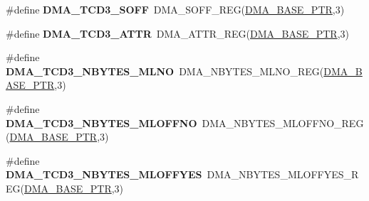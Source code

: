 \begin{DoxyCompactItemize}
\item 
\hypertarget{group___d_m_a___register___accessor___macros_ga15058eb1943489c3a2f36308d61fd628}{}\#define {\bfseries D\+M\+A\+\_\+\+T\+C\+D3\+\_\+\+S\+O\+F\+F}~D\+M\+A\+\_\+\+S\+O\+F\+F\+\_\+\+R\+E\+G(\hyperlink{group___d_m_a___peripheral_ga6997fbc1b1973e9f27170217a3bd6f22}{D\+M\+A\+\_\+\+B\+A\+S\+E\+\_\+\+P\+T\+R},3)\label{group___d_m_a___register___accessor___macros_ga15058eb1943489c3a2f36308d61fd628}

\item 
\hypertarget{group___d_m_a___register___accessor___macros_ga2782d5194fea9642ce17125a8c1b8e67}{}\#define {\bfseries D\+M\+A\+\_\+\+T\+C\+D3\+\_\+\+A\+T\+T\+R}~D\+M\+A\+\_\+\+A\+T\+T\+R\+\_\+\+R\+E\+G(\hyperlink{group___d_m_a___peripheral_ga6997fbc1b1973e9f27170217a3bd6f22}{D\+M\+A\+\_\+\+B\+A\+S\+E\+\_\+\+P\+T\+R},3)\label{group___d_m_a___register___accessor___macros_ga2782d5194fea9642ce17125a8c1b8e67}

\item 
\hypertarget{group___d_m_a___register___accessor___macros_ga19846e750847e4f60b1e73fed4224075}{}\#define {\bfseries D\+M\+A\+\_\+\+T\+C\+D3\+\_\+\+N\+B\+Y\+T\+E\+S\+\_\+\+M\+L\+N\+O}~D\+M\+A\+\_\+\+N\+B\+Y\+T\+E\+S\+\_\+\+M\+L\+N\+O\+\_\+\+R\+E\+G(\hyperlink{group___d_m_a___peripheral_ga6997fbc1b1973e9f27170217a3bd6f22}{D\+M\+A\+\_\+\+B\+A\+S\+E\+\_\+\+P\+T\+R},3)\label{group___d_m_a___register___accessor___macros_ga19846e750847e4f60b1e73fed4224075}

\item 
\hypertarget{group___d_m_a___register___accessor___macros_ga15bc0c9aad4d4aad6febd15eb31cc834}{}\#define {\bfseries D\+M\+A\+\_\+\+T\+C\+D3\+\_\+\+N\+B\+Y\+T\+E\+S\+\_\+\+M\+L\+O\+F\+F\+N\+O}~D\+M\+A\+\_\+\+N\+B\+Y\+T\+E\+S\+\_\+\+M\+L\+O\+F\+F\+N\+O\+\_\+\+R\+E\+G(\hyperlink{group___d_m_a___peripheral_ga6997fbc1b1973e9f27170217a3bd6f22}{D\+M\+A\+\_\+\+B\+A\+S\+E\+\_\+\+P\+T\+R},3)\label{group___d_m_a___register___accessor___macros_ga15bc0c9aad4d4aad6febd15eb31cc834}

\item 
\hypertarget{group___d_m_a___register___accessor___macros_gab3dd0db34f893d8115cc7bf6f0bd5a07}{}\#define {\bfseries D\+M\+A\+\_\+\+T\+C\+D3\+\_\+\+N\+B\+Y\+T\+E\+S\+\_\+\+M\+L\+O\+F\+F\+Y\+E\+S}~D\+M\+A\+\_\+\+N\+B\+Y\+T\+E\+S\+\_\+\+M\+L\+O\+F\+F\+Y\+E\+S\+\_\+\+R\+E\+G(\hyperlink{group___d_m_a___peripheral_ga6997fbc1b1973e9f27170217a3bd6f22}{D\+M\+A\+\_\+\+B\+A\+S\+E\+\_\+\+P\+T\+R},3)\label{group___d_m_a___register___accessor___macros_gab3dd0db34f893d8115cc7bf6f0bd5a07}


\end{DoxyCompactItemize}
